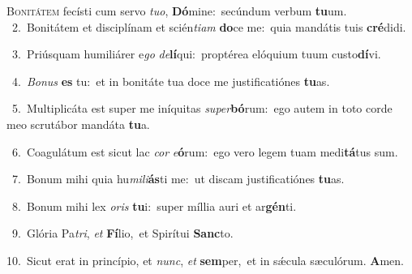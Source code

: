 \lettrine{\initial\textcolor{\initialcolor}{B}}{onitátem} fecísti cum servo \textit{tu}\-\textit{o}, \textbf{Dó}\-mine:~\star secúndum verbum \textbf{tu}\-um.\\
{\numbfont\textcolor{\numbcolor}{~2.}}~Bonitátem et disciplínam et scién\-\textit{ti}\-\textit{am} \textbf{do}\-ce me:~\star quia mandátis tuis \textbf{cré}\-didi.\par
{\numbfont\textcolor{\numbcolor}{~3.}}~Priúsquam humiliárer e\textit{go} \textit{de}\-\textbf{lí}qui:~\star proptérea elóquium tuum custo\-\textbf{dí}\-vi.\par
{\numbfont\textcolor{\numbcolor}{~4.}}~\-\textit{Bo}\-\textit{nus} \textbf{es} tu:~\star et in bonitáte tua doce me justificatiónes \textbf{tu}\-as.\par
{\numbfont\textcolor{\numbcolor}{~5.}}~Multiplicáta est super me iníquitas \textit{su}\-\textit{per}\textbf{bó}rum:~\star ego autem in toto corde meo scrutábor mandáta \textbf{tu}\-a.\par
{\numbfont\textcolor{\numbcolor}{~6.}}~Coagulátum est sicut lac \textit{cor} \textit{e}\-\textbf{ó}rum:~\star ego vero legem tuam medi\-\textbf{tá}\-tus sum.\par
{\numbfont\textcolor{\numbcolor}{~7.}}~Bonum mihi quia hu\-\textit{mi}\-\textit{li}\textbf{ás}ti me:~\star ut discam justificatiónes \textbf{tu}\-as.\par
{\numbfont\textcolor{\numbcolor}{~8.}}~Bonum mihi lex \textit{o}\-\textit{ris} \textbf{tu}\-i:~\star super míllia auri et ar\-\textbf{gén}\-ti.\par
{\numbfont\textcolor{\numbcolor}{~9.}}~Glória Pa\-\textit{tri}\-, \textit{et} \textbf{Fí}\-lio,~\star et Spirítui \textbf{Sanc}\-to.\par
{\numbfont\textcolor{\numbcolor}{10.}}~Sicut erat in princípio, et \textit{nunc}\-, \textit{et} \textbf{sem}\-per,~\star et in sǽcula sæculórum. \textbf{A}\-men.\par
